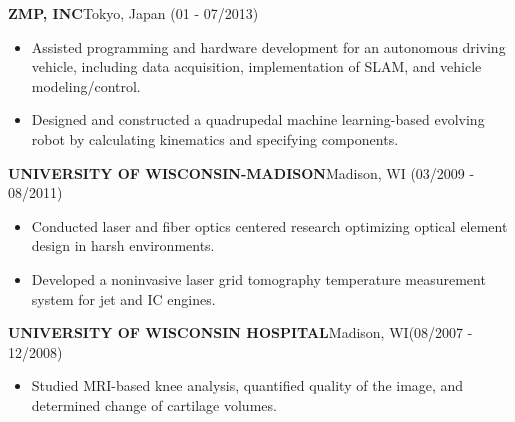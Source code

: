 \documentclass[10pt,letterpaper]{article}
\begin{document}
\MakeUppercase{\bf ZMP, Inc}\hfill{Tokyo, Japan }{(01 - 07/2013)}\\
\hspace{5mm}{\bf Research Engineer in Autonomous Vehicles}
\begin{itemize}
\item Assisted programming and hardware development for an autonomous driving vehicle, including data acquisition, implementation of SLAM, and vehicle modeling/control.
\item Designed and constructed a quadrupedal machine learning-based evolving robot by calculating kinematics and specifying components.
\end{itemize}

\MakeUppercase{\bf University of Wisconsin-Madison}\hfill{Madison, WI}{ (03/2009 - 08/2011)}\\
\hspace{5mm}{\bf Graduate Research Assistant for Engine Research Center}
\begin{itemize}
\item Conducted laser and fiber optics centered research optimizing optical element design in harsh environments. 
\item Developed a noninvasive laser grid tomography temperature measurement system for jet and IC engines.
\end{itemize}

\MakeUppercase{\bf University of Wisconsin Hospital}\hfill{Madison, WI}{ {(08/2007 - 12/2008)}}\\
\hspace{5mm}{\bf MRI Research Assistant for Radiology Department}
\begin{itemize}
\item Studied MRI-based knee analysis, quantified quality of the image, and determined change of cartilage volumes.
\end{itemize}

\vspace{-5mm}
\end{document}
